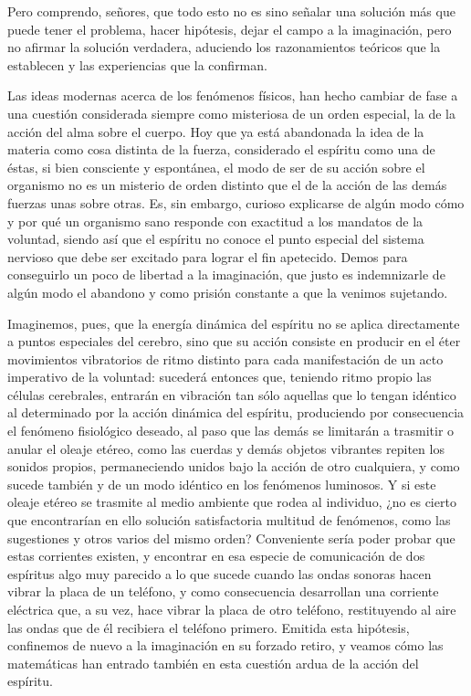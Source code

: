 \documentclass[a4paper, 12pt]{article}
\begin{document}
Pero comprendo, señores, que todo esto no es sino señalar una solución más que puede tener el problema, hacer hipótesis, dejar el campo a la imaginación, pero no afirmar la solución verdadera, aduciendo los razonamientos teóricos que la establecen y las experiencias que la confirman.

Las ideas modernas acerca de los fenómenos físicos, han hecho cambiar de fase a una cuestión considerada siempre como misteriosa de un orden especial, la de la acción del alma sobre el cuerpo. Hoy que ya está abandonada la idea de la materia como cosa distinta de la fuerza, considerado el espíritu como una de éstas, si bien consciente y espontánea, el modo de ser de su acción sobre el organismo no es un misterio de orden distinto que el de la acción de las demás fuerzas unas sobre otras. Es, sin embargo, curioso explicarse de algún modo cómo y por qué un organismo sano responde con exactitud a los mandatos de la voluntad, siendo así que el espíritu no conoce el punto especial del sistema nervioso que debe ser excitado para lograr el fin apetecido. Demos para conseguirlo un poco de libertad a la imaginación, que justo es indemnizarle de algún modo el abandono y como prisión constante a que la venimos sujetando.

Imaginemos, pues, que la energía dinámica del espíritu no se aplica directamente a puntos especiales del cerebro, sino que su acción consiste en producir en el éter movimientos vibratorios de ritmo distinto para cada manifestación de un acto imperativo de la voluntad: sucederá entonces que, teniendo ritmo propio las células cerebrales, entrarán en vibración tan sólo aquellas que lo tengan idéntico al determinado por la acción dinámica del espíritu, produciendo por consecuencia el fenómeno fisiológico deseado, al paso que las demás se limitarán a trasmitir o anular el oleaje etéreo, como las cuerdas y demás objetos vibrantes repiten los sonidos propios, permaneciendo unidos bajo la acción de otro cualquiera, y como sucede también y de un modo idéntico en los fenómenos luminosos. Y si este oleaje etéreo se trasmite al medio ambiente que rodea al individuo, ¿no es cierto que encontrarían en ello solución satisfactoria multitud de fenómenos, como las sugestiones y otros varios del mismo orden? Conveniente sería poder probar que estas corrientes existen, y encontrar en esa especie de comunicación de dos espíritus algo muy parecido a lo que sucede cuando las ondas sonoras hacen vibrar la placa de un teléfono, y como consecuencia desarrollan una corriente eléctrica que, a su vez, hace vibrar la placa de otro teléfono, restituyendo al aire las ondas que de él recibiera el teléfono primero. Emitida esta hipótesis, confinemos de nuevo a la imaginación en su forzado retiro, y veamos cómo las matemáticas han entrado también en esta cuestión ardua de la acción del espíritu.
\end{document}
